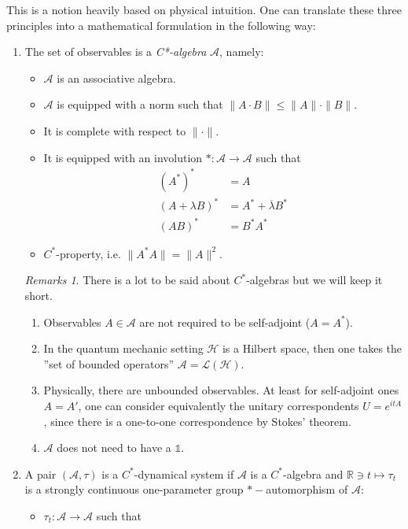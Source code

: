 \documentclass[
a4paper, %
11pt, %
onecolumn, %
openany, %
]{memoir}
\theoremstyle{definition}
\theoremstyle{remark}
\newtheorem{remarks}{Remarks}[chapter]
\theoremstyle{plain}
\begin{document}
This is a notion heavily based on physical intuition. One can translate these three principles into a mathematical formulation in the following way: \begin{enumerate}
	\item The set of observables is a \textit{C*-algebra} $\mathcal{A}$, namely: \begin{itemize}
		\item $\mathcal{A}$ is an associative algebra.
		\item $\mathcal{A}$ is equipped with a norm such that $\|A\cdot B\| \leq \| A \|\cdot \| B\| $.
		\item It is complete with respect to $\| \cdot \|$.
		\item It is equipped with an involution $*:\mathcal{A}\rightarrow \mathcal{A}$ such that \begin{align}
		(A^*)^*&=A\\
		(A+\lambda B)^* &= A^* +\overline{\lambda}B^*\\
		(AB)^*&=B^*A^*
		\end{align}
		\item $C^*$-property, i.e. $\|A^*A\|=\|A\|^2$.
	\end{itemize}
\begin{remarks}
	There is a lot to be said about $C^*$-algebras but we will keep it short. \begin{enumerate}
		\item Observables $A\in\mathcal{A}$ are not required to be self-adjoint ($A=A^*$).
		\item In the quantum mechanic setting $\mathcal{H}$ is a Hilbert space, then one takes the ''set of bounded operators'' $\mathcal{A}=\mathcal{L}(\mathcal{H})$.
		\item Physically, there are unbounded observables. At least for self-adjoint ones $A=A'$, one can consider equivalently the unitary correspondents $U=e^{itA}$, since there is a one-to-one correspondence by Stokes' theorem.
		\item $\mathcal{A}$ does not need to have a $\mathds{1}$.
	\end{enumerate}
\end{remarks}
\item A pair $(\mathcal{A},\tau)$ is a $C^*$-dynamical system if $\mathcal{A}$ is a $C^*$-algebra and $\mathbb{R}\ni t\mapsto \tau_t$ is a strongly continuous one-parameter group $*-$automorphism of $\mathcal{A}$: \begin{itemize}
	\item $\tau_t:\mathcal{A}\rightarrow \mathcal{A}$ such that \begin{align}

\end{align}
\end{itemize}
\end{enumerate}
\end{document}
